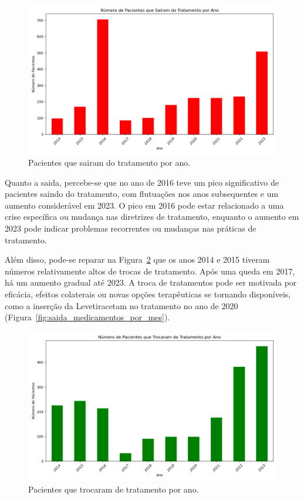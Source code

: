 \documentclass[article,a4paper,12pt,brazil,sumario=tradicional]{abntex2}
\begin{document}
\begin{figure}[!ht]
    \centering
    \includegraphics[width=1\textwidth]{pacientes_sairam_tratamento_por_ano.png}
    \caption{Pacientes que sairam do tratamento por ano.}
    \label{fig:pacientes_sairam_tratamento_por_ano}
\end{figure}

Quanto a saida, percebe-se que no ano de 2016 teve um pico significativo de pacientes saindo do tratamento, com flutuações nos anos subsequentes e um aumento considerável em 2023. O pico em 2016 pode estar relacionado a uma crise específica ou mudança nas diretrizes de tratamento, enquanto o aumento em 2023 pode indicar problemas recorrentes ou mudanças nas práticas de tratamento.

Além disso, pode-se reparar na Figura~\ref{fig:pacientes_troca_tratamento_por_ano} que os anos 2014 e 2015 tiveram números relativamente altos de trocas de tratamento. Após uma queda em 2017, há um aumento gradual até 2023. A troca de tratamentos pode ser motivada por eficácia, efeitos colaterais ou novas opções terapêuticas se tornando disponíveis, como a inserção da Levetiracetam no tratamento no ano de 2020 (Figura~\ref{fig:saida_medicamentos_por_mes}).

\begin{figure}[!ht]
    \centering
    \includegraphics[width=1\textwidth]{pacientes_troca_tratamento_por_ano.png}
    \caption{Pacientes que trocaram de tratamento por ano.}
    \label{fig:pacientes_troca_tratamento_por_ano}
\end{figure}
\end{document}
